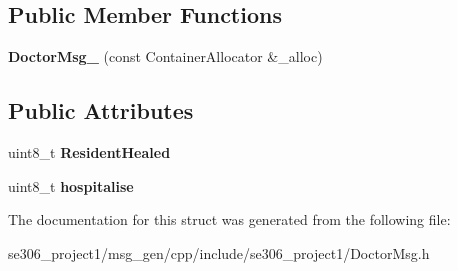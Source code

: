 \subsection*{Public Member Functions}
\begin{DoxyCompactItemize}
\item 
\hypertarget{structse306__project1_1_1DoctorMsg___a011e25faaa89c7cc8a34e8ef14c9e486}{{\bfseries Doctor\-Msg\-\_\-} (const Container\-Allocator \&\-\_\-alloc)}\label{structse306__project1_1_1DoctorMsg___a011e25faaa89c7cc8a34e8ef14c9e486}

\end{DoxyCompactItemize}
\subsection*{Public Attributes}
\begin{DoxyCompactItemize}
\item 
\hypertarget{structse306__project1_1_1DoctorMsg___a920e464dbcb861b061ef834a386d5b9f}{uint8\-\_\-t {\bfseries Resident\-Healed}}\label{structse306__project1_1_1DoctorMsg___a920e464dbcb861b061ef834a386d5b9f}

\item 
\hypertarget{structse306__project1_1_1DoctorMsg___a1c3941a076ae6d80ce7f8e514c5021a9}{uint8\-\_\-t {\bfseries hospitalise}}\label{structse306__project1_1_1DoctorMsg___a1c3941a076ae6d80ce7f8e514c5021a9}

\end{DoxyCompactItemize}


The documentation for this struct was generated from the following file\-:\begin{DoxyCompactItemize}
\item 
se306\-\_\-project1/msg\-\_\-gen/cpp/include/se306\-\_\-project1/Doctor\-Msg.\-h\end{DoxyCompactItemize}
